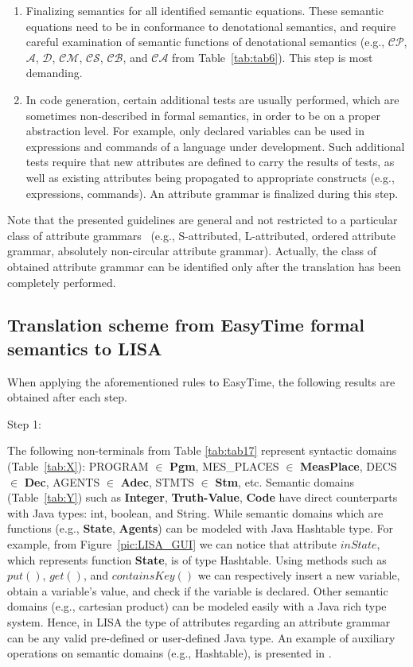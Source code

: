 \documentclass[preprint, prX]{revtex4}
\begin{document}
\begin{enumerate}
  \item Finalizing semantics for all identified semantic equations. These semantic equations need to be in conformance to denotational semantics, and require careful examination of semantic functions of denotational semantics (e.g., $\mathcal{CP}$, $\mathcal{A}$, $\mathcal{D}$, $\mathcal{CM}$, $\mathcal{CS}$,
$\mathcal{CB}$, and $\mathcal{CA}$ from Table~\ref{tab:tab6}). This step is most demanding.
  \item In code generation, certain additional tests are usually performed, which are sometimes non-described in formal semantics, in order to be on a proper abstraction level. For example, only declared variables can be used in expressions and commands of a language under development. Such additional tests require that new attributes are defined to carry the results of tests, as well as existing attributes being propagated to appropriate constructs (e.g., expressions, commands). An attribute grammar is finalized during this step.
\end{enumerate}

Note that the presented guidelines are general and not restricted to a particular class of attribute grammars~\cite{Knuth:1968,Paakki:1995} (e.g., S-attributed, L-attributed, ordered attribute grammar, absolutely non-circular attribute grammar). Actually, the class of obtained attribute grammar can be identified only after the translation has been completely performed.


\subsection{Translation scheme from EasyTime formal semantics to LISA}
When applying the aforementioned rules to EasyTime, the following results are obtained after each step.

Step 1:

The following non-terminals from Table \ref{tab:tab17} represent syntactic domains (Table~\ref{tab:X}):
PROGRAM $\in$ \textbf{Pgm}, MES\_PLACES $\in$ \textbf{MeasPlace}, DECS $\in$ \textbf{Dec}, AGENTS $\in$ \textbf{Adec},
STMTS $\in$ \textbf{Stm}, etc. Semantic domains (Table~\ref{tab:Y}) such as \textbf{Integer}, \textbf{Truth-Value}, \textbf{Code} have direct counterparts with Java types: int, boolean, and String. While semantic domains which are functions (e.g., \textbf{State}, \textbf{Agents}) can be modeled with Java  Hashtable type.
For example, from Figure~\ref{pic:LISA_GUI} we can notice that attribute $inState$, which represents function \textbf{State}, is of type Hashtable. Using methods such as
$put()$, $get()$, and $containsKey()$ we can respectively insert a new variable, obtain a variable's value, and check if the variable is declared.
Other semantic domains (e.g., cartesian product) can be modeled easily with a Java rich type system. Hence, in LISA the type of attributes regarding an attribute grammar can be any valid pre-defined or user-defined Java type. An example of auxiliary operations on semantic domains (e.g., Hashtable), is presented in \cite{Fister:2011a}.
\end{document}
